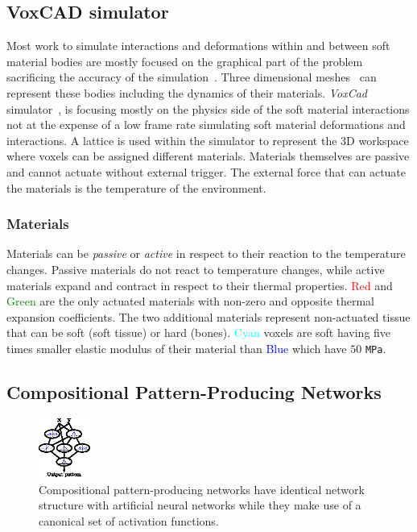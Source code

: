 \documentclass{sig-alternate}
\begin{document}
\subsection{VoxCAD simulator}

Most work to simulate interactions and deformations within and between soft material bodies are mostly focused on the graphical part of the problem~\cite{faloutsos1997dynamic} sacrificing the accuracy of the simulation~\cite{teschner2004versatile}. Three dimensional meshes~\cite{muller2002stable} can represent these bodies including the dynamics of their materials. \emph{VoxCad} simulator~\cite{hiller2012dynamic}, is focusing mostly on the physics side of the soft material interactions not at the expense of a low frame rate simulating soft material deformations and interactions. A lattice is used within the simulator to represent the 3D workspace where voxels can be assigned different materials. Materials themselves are passive and cannot actuate without external trigger. The external force that can actuate the materials is the temperature of the environment.

\subsubsection*{Materials}

Materials can be \emph{passive} or \emph{active} in respect to their reaction to the temperature changes. Passive materials do not react to temperature changes, while active materials expand and contract in respect to their thermal properties. \textcolor{Red}{Red} and \textcolor{Green}{Green} are the only actuated materials with non-zero and opposite thermal expansion coefficients. The two additional materials represent non-actuated tissue that can be soft (soft tissue) or hard (bones). \textcolor{Cyan}{Cyan} voxels are soft having five times smaller elastic modulus of their material than \textcolor{Blue}{Blue} which have $50$ \texttt{MPa}.




\subsection{Compositional Pattern-Producing Networks}

\begin{figure}[t!]
\centering
\includegraphics[width=0.15\textwidth]{../Figures/Misc/cppnNetwork.eps}
\caption{Compositional pattern-producing networks have identical network structure with artificial neural networks while they make use of a canonical set of activation functions.}
\label{fig:cppnNetwork}
\end{figure}
\end{document}
